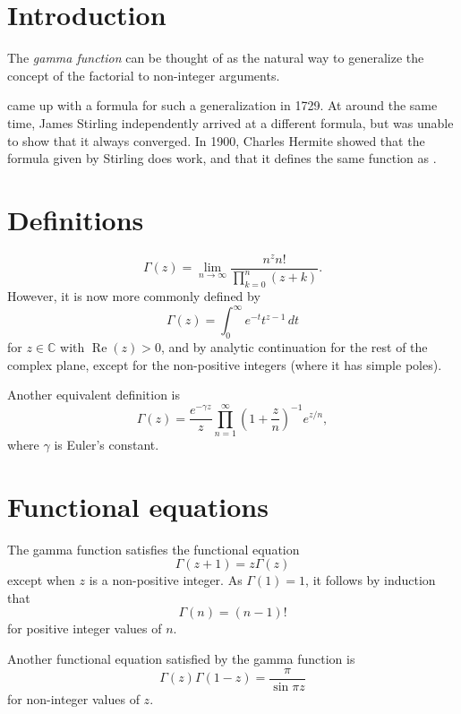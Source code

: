 \documentclass[12pt]{article}
\def\C{\mathbb{C}}
\def\Re{\operatorname{Re}}
\begin{document}

\section*{Introduction}

The \emph{gamma function} can be thought of as
the natural way to generalize the concept of the factorial
to non-integer arguments.

came up with a formula for such a generalization in 1729.
At around the same time,
James Stirling independently arrived at a different formula,
but was unable to show that it always converged.
In 1900, Charles Hermite showed that the formula given by Stirling does work,
and that it defines the same function as .

\section*{Definitions}

\[
  \Gamma(z) = \lim_{n\to\infty}\frac{n^z n!}{\prod_{k=0}^n(z+k)}.
\]
However, it is now more commonly defined by
\[
  \Gamma(z) = \int_0^\infty \! e^{-t} t^{z-1} \, dt
\]
for $z\in\C$ with $\Re(z)>0$,
and by analytic continuation for the rest of the complex plane,
except for the non-positive integers (where it has simple poles).

Another equivalent definition is
\[
  \Gamma(z) = \frac{e^{-\gamma z}}{z}
  \prod_{n=1}^\infty \left(1 + \frac{z}{n}\right)^{-1} e^{z/n},
\]
where $\gamma$ is Euler's constant.

\section*{Functional equations}

The gamma function satisfies the functional equation
\[
  \Gamma(z+1) = z \Gamma(z)
\]
except when $z$ is a non-positive integer.
As $\Gamma(1)=1$, it follows by induction that
\[
  \Gamma(n) = (n-1)!
\]
for positive integer values of $n$.

Another functional equation satisfied by the gamma function is
\[
  \Gamma(z) \Gamma(1-z) = \frac{\pi}{\sin \pi z}
\]
for non-integer values of $z$.
\end{document}
